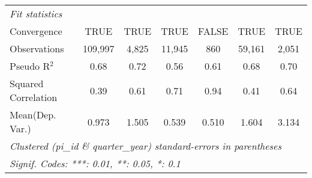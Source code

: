 \begin{tabular}{lcccccc}
   \midrule
   \emph{Fit statistics}\\
   Convergence                                                &TRUE            & TRUE         & TRUE        & FALSE         & TRUE          & TRUE\\  
   Observations                                               & 109,997        & 4,825        & 11,945      & 860           & 59,161        & 2,051\\  
   Pseudo R$^2$                                               & 0.68           & 0.72         & 0.56        & 0.61          & 0.68          & 0.70\\  
   Squared Correlation                                        & 0.39           & 0.61         & 0.71        & 0.94          & 0.41          & 0.64\\  
Mean(Dep. Var.) & 0.973 & 1.505 & 0.539 & 0.510 & 1.604 & 3.134 \\
   \midrule \midrule
   \multicolumn{7}{l}{\emph{Clustered (pi\_id \& quarter\_year) standard-errors in parentheses}}\\
   \multicolumn{7}{l}{\emph{Signif. Codes: ***: 0.01, **: 0.05, *: 0.1}}\\
\end{tabular}
\par\endgroup
